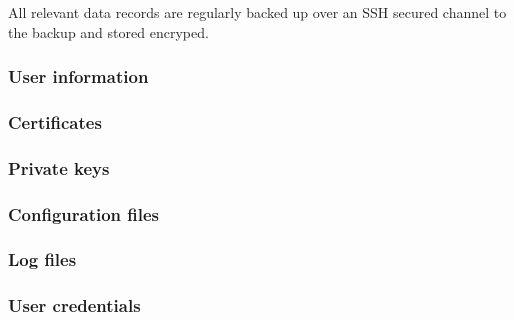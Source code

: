 \documentclass[english]{article}
\begin{document}
All relevant data records are regularly backed up over an SSH secured channel to the backup and stored encryped.



\subsubsection{User information}



\subsubsection{Certificates}



\subsubsection{Private keys}



\subsubsection{Configuration files}



\subsubsection{Log files}



\subsubsection{User credentials}
\end{document}
